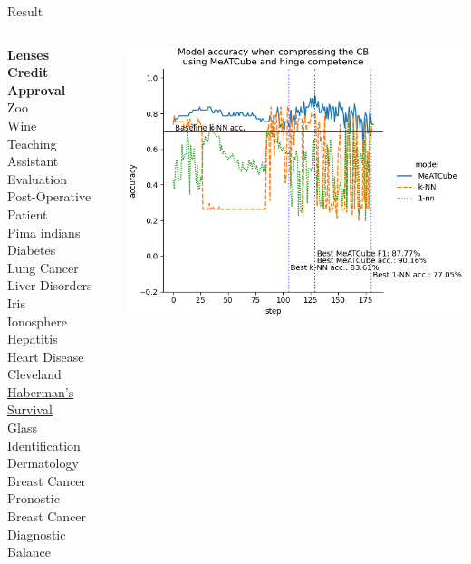 \documentclass[]{beamer}
\begin{document}
\begin{frame}{Result}
    \begin{columns}
        \begin{column}{.35\textwidth}
            {\smaller\smaller
            \textbf{Lenses} \\
            \textbf{Credit Approval} \\
            Zoo \\
            Wine \\
            Teaching Assistant Evaluation \\
            Post-Operative Patient \\
            Pima indians Diabetes \\
            Lung Cancer \\
            Liver Disorders \\
            Iris \\
            Ionosphere \\
            Hepatitis \\
            Heart Disease Cleveland \\
            \underline{Haberman's Survival} \\
            Glass Identification \\
            Dermatology \\
            Breast Cancer Pronostic \\
            Breast Cancer Diagnostic \\
            Balance\\
            ~}
        \end{column}
        \begin{column}{.65\textwidth}
            \includegraphics[width=.8\textwidth]{../results/figs/haberman+s+survival.png}

\end{column}
\end{columns}
\end{frame}
\end{document}

